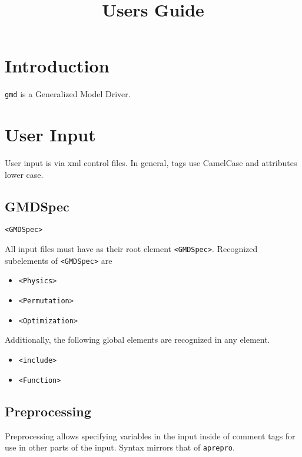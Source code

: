 \documentclass[11pt]{report}
\title{\gmd{} Users Guide}
\newcommand{\gmd}{\texttt{gmd}}
\newcommand{\tag}[1]{\texttt{<#1>}}
\begin{document}
\maketitle

\chapter{Introduction}
\gmd{} is a Generalized Model Driver.

\chapter{User Input}
User input is via xml control files. In general, tags use CamelCase and
attributes lower case.

\section{GMDSpec}
\begin{verbatim}
<GMDSpec>
\end{verbatim}
%
All input files must have as their root element \tag{GMDSpec}. Recognized
subelements of \tag{GMDSpec} are
%
\begin{itemize}
  \item \tag{Physics}
  \item \tag{Permutation}
  \item \tag{Optimization}
\end{itemize}

Additionally, the following global elements are recognized in any element.
%
\begin{itemize}
  \item \tag{include}
  \item \tag{Function}
\end{itemize}

\section{Preprocessing}
Preprocessing allows specifying variables in the input inside of comment tags
for use in other parts of the input. Syntax mirrors that of \texttt{aprepro}.
\end{document}
